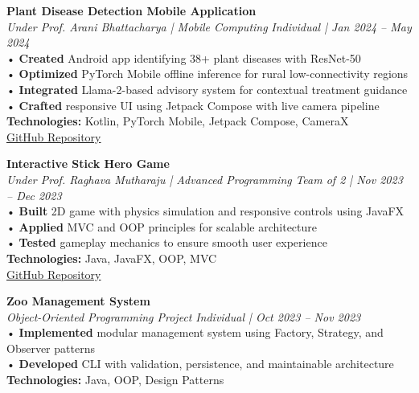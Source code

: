 \documentclass[10pt]{extarticle}
\begin{document}
\vspace{8pt}

\begin{contained}
\vspace{5pt}

\textbf{Plant Disease Detection Mobile Application}\\
\textit{Under Prof. Arani Bhattacharya | Mobile Computing} 
\hfill \textit{Individual | Jan 2024 – May 2024}\\
\vspace{3pt}
• \textbf{Created} Android app identifying 38+ plant diseases with ResNet-50\\
• \textbf{Optimized} PyTorch Mobile offline inference for rural low-connectivity regions\\
• \textbf{Integrated} Llama-2-based advisory system for contextual treatment guidance\\
• \textbf{Crafted} responsive UI using Jetpack Compose with live camera pipeline\\
\textbf{Technologies:} Kotlin, PyTorch Mobile, Jetpack Compose, CameraX\\
\href{https://github.com/Himanshu8368/MC_project}{GitHub Repository}

\vspace{10pt}

\textbf{Interactive Stick Hero Game}\\
\textit{Under Prof. Raghava Mutharaju | Advanced Programming}
\hfill \textit{Team of 2 | Nov 2023 – Dec 2023}\\
\vspace{3pt}
• \textbf{Built} 2D game with physics simulation and responsive controls using JavaFX\\
• \textbf{Applied} MVC and OOP principles for scalable architecture\\
• \textbf{Tested} gameplay mechanics to ensure smooth user experience\\
\textbf{Technologies:} Java, JavaFX, OOP, MVC\\
\href{https://github.com/Himanshu8368/Ap-Project}{GitHub Repository}

\vspace{10pt}

\textbf{Zoo Management System}\\
\textit{Object-Oriented Programming Project}
\hfill \textit{Individual | Oct 2023 – Nov 2023}\\
\vspace{3pt}
• \textbf{Implemented} modular management system using Factory, Strategy, and Observer patterns\\
• \textbf{Developed} CLI with validation, persistence, and maintainable architecture\\
\textbf{Technologies:} Java, OOP, Design Patterns\\


\end{contained}
\end{document}
